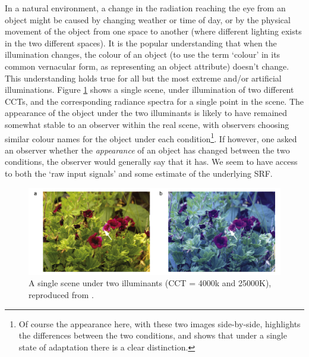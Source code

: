 In a natural environment, a change in the radiation reaching the eye from an object might be caused by changing weather or time of day, or by the physical movement of the object from one space to another (where different lighting exists in the two different spaces). It is the popular understanding that when the illumination changes, the colour of an object (to use the term `colour' in its common vernacular form, as representing an object attribute) doesn't change. This understanding holds true for all but the most extreme and/or artificial illuminations. Figure \ref{fig:fosterflowers} shows a single scene, under illumination of two different \glspl{CCT}, and the corresponding radiance spectra for a single point in the scene. The appearance of the object under the two illuminants is likely to have remained somewhat stable to an observer within the real scene, with observers choosing similar colour names for the object under each condition\footnote{Of course the appearance here, with these two images side-by-side, highlights the differences between the two conditions, and shows that under a single state of adaptation there is a clear distinction.}. If however, one asked an observer whether the \emph{appearance} of an object has changed between the two conditions, the observer would generally say that it has. We seem to have access to both the `raw input signals' and some estimate of the underlying \gls{SRF}.

\begin{figure}[htbp]
\includegraphics[max width=\textwidth]{figs/LitRev/fosterflowers.png}
\caption{A single scene under two illuminants (\Gls{CCT} = 4000k and 25000K), reproduced from \citet{foster_color_2011}.}
\label{fig:fosterflowers}
\end{figure}

